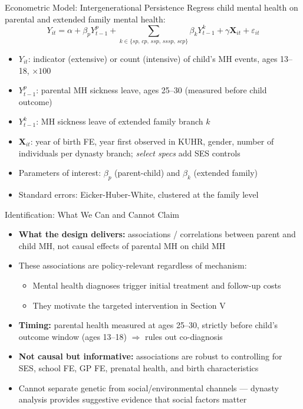 \documentclass[aspectratio=169]{beamer}
\begin{document}
\begin{frame}{Econometric Model: Intergenerational Persistence}
  \small
  Regress child mental health on parental and extended family mental health:
  \[
    Y_{it} = \alpha + \beta_p Y^p_{t-1} + \sum_{k \in \{sp,\, cp,\, ssp,\, sssp,\, scp\}} \beta_k Y^k_{t-1} + \gamma \mathbf{X}_{it} + \varepsilon_{it}
  \]
  \begin{itemize}
    \item $Y_{it}$: indicator (extensive) or count (intensive) of child's MH events, ages 13--18, $\times 100$
    \item $Y^p_{t-1}$: parental MH sickness leave, ages 25--30 (measured before child outcome)
    \item $Y^k_{t-1}$: MH sickness leave of extended family branch $k$
    \item $\mathbf{X}_{it}$: year of birth FE, year first observed in KUHR, gender, number of individuals per dynasty branch; \emph{select specs} add SES controls
    \item Parameters of interest: $\beta_p$ (parent-child) and $\beta_k$ (extended family)
    \item Standard errors: Eicker-Huber-White, clustered at the family level
  \end{itemize}
\end{frame}

\begin{frame}{Identification: What We Can and Cannot Claim}
  \begin{itemize}
    \item \textbf{What the design delivers:} associations / correlations between parent and child MH, not causal effects of parental MH on child MH
    \item These associations are policy-relevant regardless of mechanism:
    \begin{itemize}
      \item Mental health diagnoses trigger initial treatment and follow-up costs
      \item They motivate the targeted intervention in Section V
    \end{itemize}
    \item \textbf{Timing:} parental health measured at ages 25--30, strictly before child's outcome window (ages 13--18) $\Rightarrow$ rules out co-diagnosis
    \item \textbf{Not causal but informative:} associations are robust to controlling for SES, school FE, GP FE, prenatal health, and birth characteristics
    \item Cannot separate genetic from social/environmental channels --- dynasty analysis provides suggestive evidence that social factors matter
  \end{itemize}
\end{frame}
\end{document}
